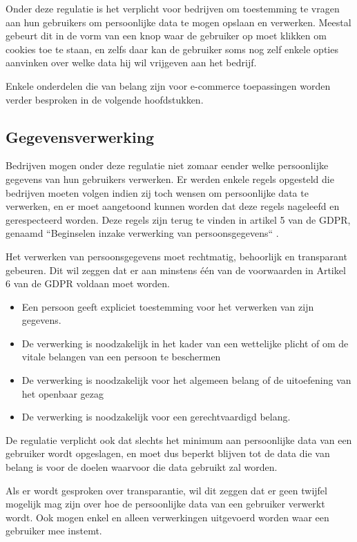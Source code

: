 Onder deze regulatie is het verplicht voor bedrijven om toestemming te vragen aan hun gebruikers om persoonlijke data te mogen opslaan en verwerken. Meestal gebeurt dit in de vorm van een knop waar de gebruiker op moet klikken om cookies toe te staan, en zelfs daar kan de gebruiker soms nog zelf enkele opties aanvinken over welke data hij wil vrijgeven aan het bedrijf. \autocite{Goddard2017}

Enkele onderdelen die van belang zijn voor e-commerce toepassingen worden verder besproken in de volgende hoofdstukken.

\subsection{Gegevensverwerking}
\label{subsec: Gegevensverwerking}

Bedrijven mogen onder deze regulatie niet zomaar eender welke persoonlijke gegevens van hun gebruikers verwerken. Er werden enkele regels opgesteld die bedrijven moeten volgen indien zij toch wensen om persoonlijke data te verwerken, en er moet aangetoond kunnen worden dat deze regels nageleefd en gerespecteerd worden. Deze regels zijn terug te vinden in artikel 5 van de GDPR, genaamd ``Beginselen inzake verwerking van persoonsgegevens`` \autocite{Article5GDPR2018}.

Het verwerken van persoonsgegevens moet rechtmatig, behoorlijk en transparant gebeuren. Dit wil zeggen dat er aan minstens één van de voorwaarden in Artikel 6 van de GDPR voldaan moet worden.
\begin{itemize}
	\item Een persoon geeft expliciet toestemming voor het verwerken van zijn gegevens.
	\item De verwerking is noodzakelijk in het kader van een wettelijke plicht of om de vitale belangen van een persoon te beschermen
	\item  De verwerking is noodzakelijk voor het algemeen belang of de uitoefening van het openbaar gezag
	\item De verwerking is noodzakelijk voor een gerechtvaardigd belang. 
\end{itemize}
\autocite{Article6GDPR2018}

De regulatie verplicht ook dat slechts het minimum aan persoonlijke data van een gebruiker wordt opgeslagen, en moet dus beperkt blijven tot de data die van belang is voor de doelen waarvoor die data gebruikt zal worden.

Als er wordt gesproken over transparantie, wil dit zeggen dat er geen twijfel mogelijk mag zijn over hoe de persoonlijke data van een gebruiker verwerkt wordt. Ook mogen enkel en alleen verwerkingen uitgevoerd worden waar een gebruiker mee instemt.


